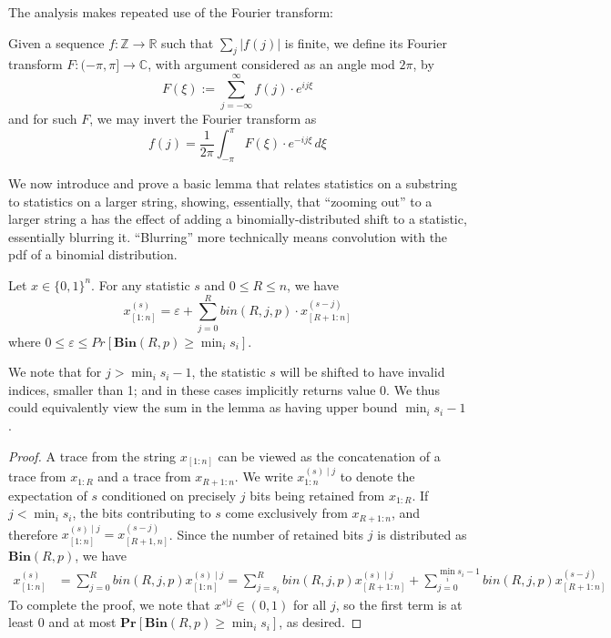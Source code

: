 \documentclass[11pt]{article}
\theoremstyle{plain}
\newcommand{\Bin}[2]{\textbf{Bin}(#1,#2)}
\renewcommand{\Pr}{\textbf{Pr}}
\newcommand{\eps}{\varepsilon}
\begin{document}
The analysis makes repeated use of the Fourier transform:

\begin{definition}
Given a sequence $f:\mathbb{Z}\rightarrow \mathbb{R}$ such that $\sum_j |f(j)|$ is finite, we define its Fourier transform $F:(-\pi,\pi]\rightarrow\mathbb{C}$, with argument considered as an angle mod $2\pi$, by
\[F(\xi):= \sum_{j=-\infty}^{\infty} f(j)\cdot e^{ij\xi}\]
and for such $F$, we may invert the Fourier transform as
\[f(j)=\frac{1}{2\pi}\int_{-\pi}^{\pi} F(\xi)\cdot e^{-ij\xi}\,d\xi\]
\end{definition}



We now introduce and prove a basic lemma that relates statistics on a substring to statistics on a larger string, showing, essentially, that ``zooming out'' to a larger string a has the effect of adding a binomially-distributed shift to a statistic, essentially blurring it. ``Blurring'' more technically means convolution with the pdf of a binomial distribution.


\begin{lemma}\label{lem:binomial-shift} Let $x \in \{0,1\}^n$. For any statistic $s$ and $0 \leq R \leq n$, we have
\[x_{[1:n]}^{(s)}=\eps+\sum_{j=0}^{R} bin(R,j,p) \cdot x_{[R+1:n]}^{(s-j)}\]
where $0\leq \eps\leq Pr[\Bin{R}{p}\geq \min_i s_i]$.
\end{lemma}
We note that for $j>\min_i s_i-1$, the statistic $s$ will be shifted to have invalid indices, smaller than 1; and in these cases implicitly returns value 0. We thus could equivalently view the sum in the lemma as having upper bound $\min_i s_i-1$.
\begin{proof}
    A trace from the string $x_{[1:n]}$ can be viewed as the concatenation of a trace from $x_{1:R}$ and a trace from $x_{R+1:n}$. We write $x^{(s) \mid j}_{1:n}$ to denote the expectation of $s$ conditioned on precisely $j$ bits being retained from $x_{1:R}$. If $j < \min_i s_i$, the bits contributing to $s$ come exclusively from $x_{R+1:n}$, and therefore $x^{(s) \mid j}_{[1:n]} = x_{[R+1,n]}^{(s-j)}$. Since the number of retained bits $j$ is distributed as $\Bin{R}{p}$, we have 
    \begin{align*}
        x_{[1:n]}^{(s)} &= \sum_{j=0}^{R} bin(R,j,p) x^{(s) \mid j}_{[1:n]} = \sum_{j=s_i}^{R} bin(R,j,p) x^{(s) \mid j}_{[R+1:n]} + \sum_{j=0}^{\min_i s_i-1} bin(R,j,p) x^{(s-j)}_{[R+1:n]} 
    \end{align*}
    To complete the proof, we note that $x^{s|j} \in (0,1)$ for all $j$, so the first term is at least $0$ and at most $\Pr[\Bin{R}{p} \geq \min_i s_i]$, as desired. 
\end{proof}
\end{document}
